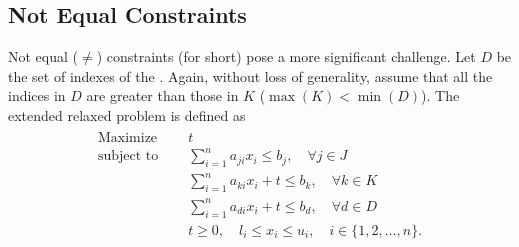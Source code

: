 \documentclass[runningheads]{llncs}
\begin{document}
\subsection{Not Equal Constraints}
\label{sec:nq-constraints}

Not equal ($\ne$) constraints (\nqcs for short) pose a more significant challenge.
Let $D$ be the set of indexes of the \nqcs.
Again, without loss of generality, assume that all the indices in $D$ are greater than those in $K$ ($\max(K) < \min(D)$).
The extended relaxed problem is defined as
\begin{align}
    \label{eq:lp-extended}
    \begin{split}
        \text{Maximize }   \quad & t                                                             \\
        \text{subject to } \quad & \sum_{i=1}^{n} a_{ji}x_{i} \le b_j, \quad \forall j \in J     \\
        \quad                    & \sum_{i=1}^{n} a_{ki}x_{i} + t \le b_k, \quad \forall k \in K \\
        \quad                    & \sum_{i=1}^{n} a_{di}x_{i} + t \le b_d, \quad \forall d \in D \\
        & t \ge 0, \quad l_i \le x_i \le u_i,  \quad i \in \{1, 2, \ldots, n\} .
    \end{split}
\end{align}
\end{document}
